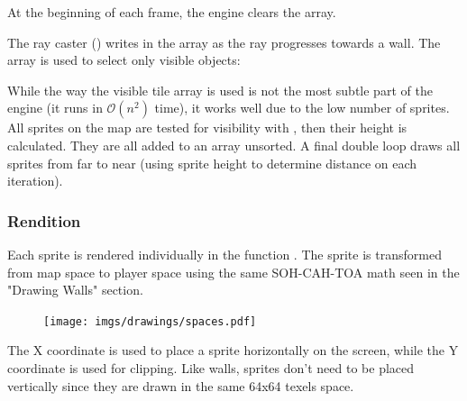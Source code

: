  At the beginning of each frame, the engine clears the array.\\
\par
\begin{minipage}{\textwidth}
 
 \end{minipage}
 \par
The ray caster () writes  in the  array as the ray progresses towards a wall. The array is used to select only visible objects:\\
\par

\par
\begin{minipage}{\textwidth}
 
 \end{minipage}
 \par

While the way the visible tile array is used is not the most subtle part of the engine (it runs in $\mathcal{O}(n^2)$ time), it works well due to the low number of sprites. All sprites on the map are tested for visibility with , then their height is calculated. They are all added to an array unsorted. A final double loop draws all sprites from far to near (using sprite height to determine distance on each iteration).\\ 




\subsubsection{Rendition}
Each sprite is rendered individually in the function . The sprite is transformed from map space to player space using the same SOH-CAH-TOA math seen in the "Drawing Walls" section.

\par
\begin{figure}[H]
\centering
 \texttt{[image: imgs/drawings/spaces.pdf]}
 \end{figure}
\par
The X coordinate is used to place a sprite horizontally on the screen, while the Y coordinate is used for clipping. Like walls, sprites don't need to be placed vertically since they are drawn in the same 64x64 texels space.\\
\par
  \begin{minipage}{.5\textwidth}
  \end{minipage}
   \begin{minipage}{.5\textwidth} 
   \end{minipage}

